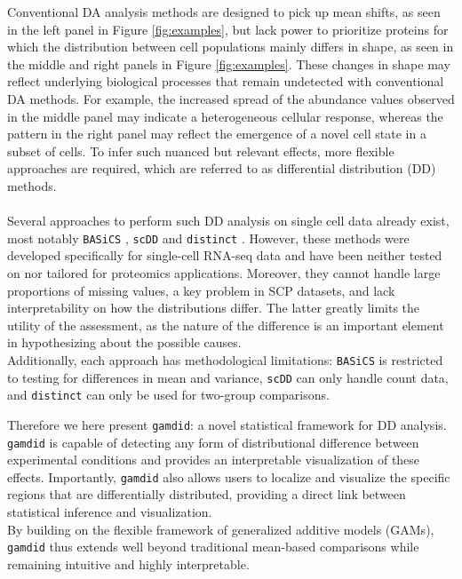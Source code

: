 Conventional DA analysis methods are designed to pick up mean shifts, as seen in the left panel in Figure \ref{fig:examples}, but lack power to prioritize proteins for which the distribution between cell populations mainly differs in shape, as seen in the middle and right panels in Figure \ref{fig:examples}.
These changes in shape may reflect underlying biological processes that remain undetected with conventional DA methods. For example, the increased
spread of the abundance values observed in the middle panel may indicate a heterogeneous cellular response, whereas the pattern in the right panel may reflect the emergence of a novel cell state in a subset of cells.
To infer such nuanced but relevant effects, more flexible approaches are required, which are referred to as differential distribution (DD) methods.
\\
\\
Several approaches to perform such DD analysis on single cell data already exist, most notably \texttt{BASiCS} \cite{basics}, \texttt{scDD} \cite{scdd} and \texttt{distinct} \cite{distinct}. However, these methods were developed specifically for single-cell RNA-seq data and have been neither tested on nor tailored for proteomics applications. Moreover, they cannot handle large proportions of missing values, a key problem in SCP datasets, and lack interpretability on how the distributions differ. The latter greatly limits the utility of the assessment, as the nature of the difference is an important element in hypothesizing about the possible causes.\\
Additionally, each approach has methodological limitations: \texttt{BASiCS} is restricted to testing for differences in mean and variance, \texttt{scDD} can only handle count data, and \texttt{distinct} can only be used for two-group comparisons.

Therefore we here present \texttt{gamdid}: a novel statistical framework for DD analysis. \texttt{gamdid} is capable of detecting any form of distributional difference between experimental conditions and provides an interpretable visualization of these effects. Importantly, \texttt{gamdid} also allows users to localize and visualize the specific regions that are differentially distributed, providing a direct link between statistical inference and visualization.\\
By building on the flexible framework of generalized additive models (GAMs), \texttt{gamdid} thus extends well beyond traditional mean-based comparisons while remaining intuitive and highly interpretable.



